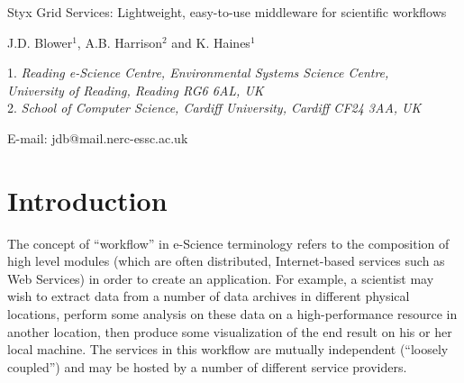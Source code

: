 \documentclass{article}
\begin{document}
\doublespacing

\begin{center}
{\Large Styx Grid Services: Lightweight, easy-to-use middleware for scientific workflows}

{\large J.D. Blower$^{1}$, A.B. Harrison$^{2}$ and K. Haines$^{1}$}

{\small 1. {\em Reading e-Science Centre, Environmental Systems Science Centre, \\
University of Reading, Reading RG6 6AL, UK} \\
2. {\em School of Computer Science, Cardiff University, Cardiff CF24 3AA, UK}}

E-mail: jdb@mail.nerc-essc.ac.uk
\end{center}

\newpage

\begin{abstract}
The service-oriented approach to performing distributed scientific research is potentially very powerful but is not yet widely used in many scientific fields.  This is partly due to the technical difficulties involved in creating services and composing them into workflows.  We present the Styx Grid Service, a simple system that wraps command-line programs and allows them to be run over the Internet exactly as if they were local programs.  Styx Grid Services are very easy to create and use and can be composed into powerful workflows with simple shell scripts or more sophisticated graphical tools.  Data can be streamed directly from service to service and progress can be monitored asynchronously using a mechanism that places very few demands on firewalls.  Styx Grid Services can interoperate with Web Services and WS-Resources.
\end{abstract}
%
\section{Introduction}\label{sec:intro}

The concept of ``workflow'' in e-Science terminology refers to the composition of high level modules (which are often distributed, Internet-based services such as Web Services) in order to create an application.  For example, a scientist may wish to extract data from a number of data archives in different physical locations, perform some analysis on these data on a high-performance resource in another location, then produce some visualization of the end result on his or her local machine.  The services in this workflow are mutually independent (``loosely coupled'') and may be hosted by a number of different service providers.
\end{document}
